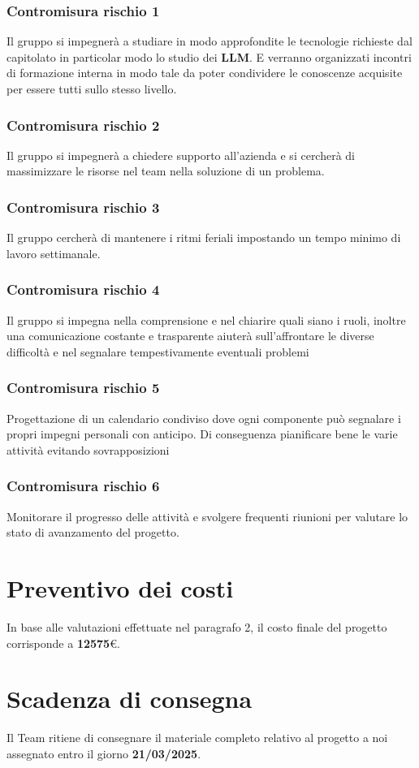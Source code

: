 \documentclass{article}
\begin{document}
\subsubsection{Contromisura rischio 1}
Il gruppo si impegnerà a studiare in modo approfondite le tecnologie richieste dal capitolato in particolar modo lo studio dei \textbf{LLM}. E verranno organizzati incontri di formazione interna in modo tale da poter condividere le conoscenze acquisite per essere tutti sullo stesso livello.
\subsubsection{Contromisura rischio 2}
Il gruppo si impegnerà a chiedere supporto all'azienda e si cercherà di massimizzare le risorse nel team nella soluzione di un problema.
\subsubsection{Contromisura rischio 3}
Il gruppo cercherà di mantenere i ritmi feriali impostando un tempo minimo di lavoro settimanale.
\subsubsection{Contromisura rischio 4}
Il gruppo si impegna nella comprensione e nel chiarire quali siano i ruoli, inoltre una comunicazione costante e trasparente aiuterà sull'affrontare le diverse difficoltà e nel segnalare tempestivamente eventuali problemi
\subsubsection{Contromisura rischio 5}
Progettazione di un calendario condiviso dove ogni componente può segnalare i propri impegni personali con anticipo. Di conseguenza pianificare bene le varie attività evitando sovrapposizioni
\subsubsection{Contromisura rischio 6}
Monitorare il progresso delle attività e svolgere frequenti riunioni per valutare lo stato di avanzamento del progetto. 

\newpage
\section{Preventivo dei costi}
In base alle valutazioni effettuate nel paragrafo 2, il costo finale del progetto corrisponde a \textbf{12575}€.

\section{Scadenza di consegna}
Il Team ritiene di consegnare il materiale completo relativo al progetto a noi assegnato entro il giorno \textbf{21/03/2025}.
\end{document}
